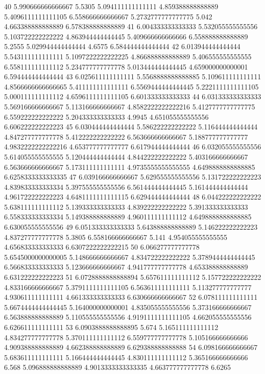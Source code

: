 40 5.990666666666667 5.5305 5.094111111111111 4.859388888888889 5.4096111111111105 6.558666666666667 5.2732777777777775 5.042 4.663388888888889 6.578388888888889
41 6.004333333333333 5.532055555555556 5.103722222222222 4.863944444444445 5.409666666666666 6.558888888888889 5.2555 5.029944444444444 4.6575 6.584444444444444
42 6.013944444444444 5.543111111111111 5.1097222222222225 4.866888888888889 5.406555555555555 6.558111111111112 5.234777777777778 5.013444444444445 4.659000000000001 6.594444444444444
43 6.025611111111111 5.5568888888888885 5.109611111111111 4.8566666666666665 5.411111111111111 6.5569444444444445 5.2221111111111105 5.000111111111112 4.6596111111111105 6.601333333333333
44 6.031333333333333 5.569166666666667 5.113166666666667 4.8582222222222216 5.4127777777777775 6.559222222222222 5.204333333333333 4.9945 4.651055555555556 6.606222222222223
45 6.030444444444444 5.586222222222222 5.116444444444444 4.847277777777778 5.412222222222222 6.563666666666667 5.188777777777777 4.9832222222222216 4.653777777777777 6.617944444444444
46 6.032055555555556 5.614055555555555 5.120444444444444 4.844222222222222 5.403166666666667 6.563666666666667 5.173111111111111 4.9735555555555555 4.6498888888888885 6.6258333333333335
47 6.039166666666667 5.629555555555556 5.131722222222223 4.839833333333334 5.397555555555556 6.561444444444445 5.161444444444444 4.961722222222223 4.6481111111111115 6.629444444444444
48 6.044222222222222 5.638111111111112 5.139333333333333 4.839222222222222 5.391333333333333 6.558333333333334 5.149388888888889 4.960111111111112 4.6498888888888885 6.630055555555556
49 6.051333333333333 5.643888888888889 5.146222222222223 4.837277777777778 5.3805 6.558166666666667 5.141 4.954055555555555 4.656833333333333 6.6307222222222215
50 6.066277777777778 5.6545000000000005 5.148666666666667 4.834722222222222 5.3789444444444445 6.566833333333333 5.123666666666667 4.941777777777778 4.653388888888889 6.631222222222223
51 6.0728888888888894 5.657611111111112 5.157722222222222 4.833166666666667 5.3791111111111105 6.563611111111111 5.113277777777777 4.930611111111111 4.661333333333333 6.630666666666667
52 6.078111111111111 5.6674444444444445 5.164000000000001 4.835055555555556 5.373166666666667 6.563888888888889 5.110555555555556 4.9191111111111105 4.662055555555556 6.626611111111111
53 6.0903888888888895 5.674 5.165111111111112 4.834277777777778 5.370111111111112 6.559777777777778 5.105166666666666 4.909388888888889 4.662388888888889 6.629388888888888
54 6.098166666666667 5.683611111111111 5.166444444444445 4.830111111111112 5.365166666666666 6.568 5.096888888888889 4.9013333333333335 4.663777777777778 6.6265
